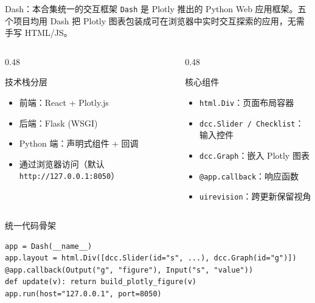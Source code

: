 \documentclass[aspectratio=169,11pt]{ctexbeamer}
\begin{document}
\begin{frame}[fragile]{Dash：本合集统一的交互框架}
  \small
  \texttt{Dash} 是 Plotly 推出的 Python Web 应用框架。五个项目均用 Dash 把 Plotly 图表包装成可在浏览器中实时交互探索的应用，无需手写 HTML/JS。

  \begin{columns}
    \begin{column}{0.48\linewidth}
      \begin{block}{技术栈分层}
        \begin{itemize}
          \item 前端：React + Plotly.js
          \item 后端：Flask (WSGI)
          \item Python 端：声明式组件 + 回调
          \item 通过浏览器访问（默认 \texttt{http://127.0.0.1:8050}）
        \end{itemize}
      \end{block}
    \end{column}
    \begin{column}{0.48\linewidth}
      \begin{block}{核心组件}
        \begin{itemize}
          \item \texttt{html.Div}：页面布局容器
          \item \texttt{dcc.Slider / Checklist}：输入控件
          \item \texttt{dcc.Graph}：嵌入 Plotly 图表
          \item \texttt{@app.callback}：响应函数
          \item \texttt{uirevision}：跨更新保留视角
        \end{itemize}
      \end{block}
    \end{column}
  \end{columns}

  \begin{block}{统一代码骨架}
\begin{Verbatim}[fontsize=\scriptsize]
app = Dash(__name__)
app.layout = html.Div([dcc.Slider(id="s", ...), dcc.Graph(id="g")])
@app.callback(Output("g", "figure"), Input("s", "value"))
def update(v): return build_plotly_figure(v)
app.run(host="127.0.0.1", port=8050)
\end{Verbatim}
  \end{block}
\end{frame}
\end{document}

